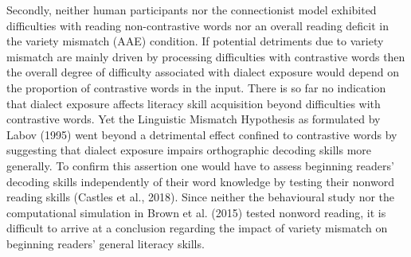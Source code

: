\documentclass[doc,floatsintext]{apa6}
\begin{document}
Secondly, neither human participants nor the connectionist model
exhibited difficulties with reading non-contrastive words nor an overall
reading deficit in the variety mismatch (AAE) condition. If potential
detriments due to variety mismatch are mainly driven by processing
difficulties with contrastive words then the overall degree of
difficulty associated with dialect exposure would depend on the
proportion of contrastive words in the input. There is so far no
indication that dialect exposure affects literacy skill acquisition
beyond difficulties with contrastive words. Yet the Linguistic Mismatch
Hypothesis as formulated by Labov (1995) went beyond a detrimental
effect confined to contrastive words by suggesting that dialect exposure
impairs orthographic decoding skills more generally. To confirm this
assertion one would have to assess beginning readers' decoding skills
independently of their word knowledge by testing their nonword reading
skills (Castles et al., 2018). Since neither the behavioural study nor
the computational simulation in Brown et al. (2015) tested nonword
reading, it is difficult to arrive at a conclusion regarding the impact
of variety mismatch on beginning readers' general literacy skills.
\end{document}
